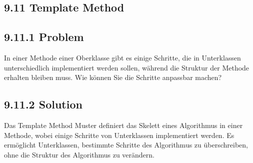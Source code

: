 \subsection*{9.11 Template Method}
\subsection*{9.11.1 Problem}
In einer Methode einer Oberklasse gibt es einige Schritte, die in Unterklassen unterschiedlich implementiert werden sollen, während die Struktur der Methode erhalten bleiben muss. Wie können Sie die Schritte anpassbar machen?

\subsection*{9.11.2 Solution}
Das Template Method Muster definiert das Skelett eines Algorithmus in einer Methode, wobei einige Schritte von Unterklassen implementiert werden. Es ermöglicht Unterklassen, bestimmte Schritte des Algorithmus zu überschreiben, ohne die Struktur des Algorithmus zu verändern.
